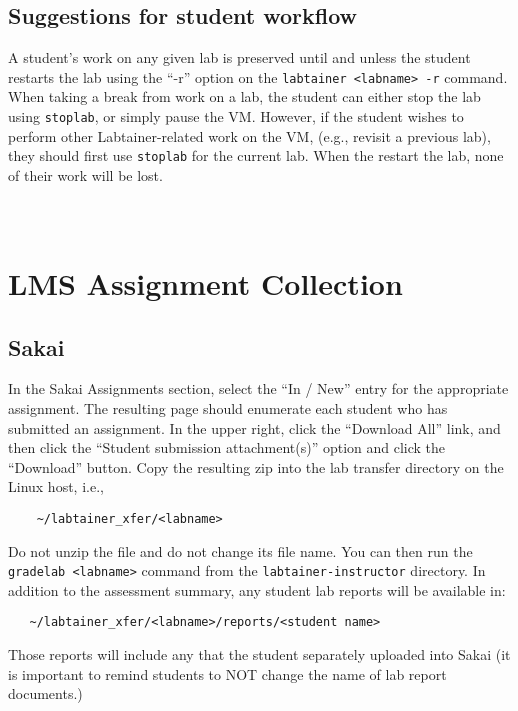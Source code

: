 \documentclass[12pt]{article}
\begin{document}
\subsection{Suggestions for student workflow}
A student's work on any given lab is preserved until and unless the student restarts the lab using the ``-r'' 
option on the {\tt labtainer <labname> -r} command.  When taking a break from work on a lab, the student can
either stop the lab using {\tt stoplab}, or simply pause the VM.  However, if the student wishes to perform other
Labtainer-related work on the VM, (e.g., revisit a previous lab), they should first use {\tt stoplab} for the current
lab.  When the restart the lab, none of their work will be lost.


\newpage
\appendix
\section{\\LMS Assignment Collection}
\label{lms collection}
\subsection{Sakai}
In the Sakai Assignments section, select the ``In / New'' entry for the appropriate assignment.
The resulting page should enumerate each student who has submitted an assignment.  In the upper right,
click the ``Download All'' link, and then click the ``Student submission attachment(s)'' option and
click the ``Download'' button.  Copy the resulting zip into the lab transfer directory 
on the Linux host, i.e.,
\begin{verbatim}
    ~/labtainer_xfer/<labname>
\end{verbatim}
\noindent Do not unzip the file and do not change its file name.
You can then run the {\tt gradelab <labname>} command from the {\tt labtainer-instructor} directory.
In addition to the assessment summary, any student lab reports will be available in:
\begin{verbatim}
   ~/labtainer_xfer/<labname>/reports/<student name> 
\end{verbatim}
\noindent Those reports will include any that the student separately uploaded into Sakai (it is 
important to remind students to NOT change the name of lab report documents.)
\end{document}
